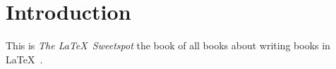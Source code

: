 \documentclass[latexsweetspot.tex]{subfiles}
\begin{document}
\chapter{Introduction}
This is \emph{The \LaTeX~Sweetspot} the book of all
books about writing books in \LaTeX~\cite{schadek:2016:tlss}.
\end{document}
